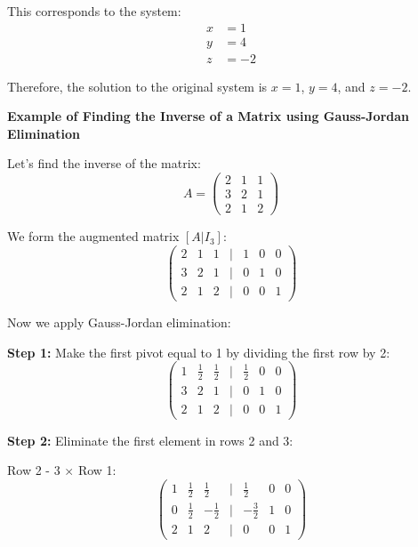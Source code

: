 This corresponds to the system:
\begin{align*}
x &= 1 \\
y &= 4 \\
z &= -2
\end{align*}

Therefore, the solution to the original system is \(x = 1\), \(y = 4\), and \(z = -2\).
\vspace{\baselineskip}

\textbf{Example of Finding the Inverse of a Matrix using Gauss-Jordan Elimination}
\vspace{\baselineskip}

Let's find the inverse of the matrix:
\begin{equation*}
A = 
\begin{pmatrix}
2 & 1 & 1 \\
3 & 2 & 1 \\
2 & 1 & 2
\end{pmatrix}
\end{equation*}

We form the augmented matrix \([A|I_3]\):
\begin{equation*}
\begin{pmatrix}
2 & 1 & 1 & | & 1 & 0 & 0 \\
3 & 2 & 1 & | & 0 & 1 & 0 \\
2 & 1 & 2 & | & 0 & 0 & 1
\end{pmatrix}
\end{equation*}

Now we apply Gauss-Jordan elimination:
\vspace{\baselineskip}

\textbf{Step 1:} Make the first pivot equal to 1 by dividing the first row by 2:
\begin{equation*}
\begin{pmatrix}
1 & \frac{1}{2} & \frac{1}{2} & | & \frac{1}{2} & 0 & 0 \\
3 & 2 & 1 & | & 0 & 1 & 0 \\
2 & 1 & 2 & | & 0 & 0 & 1
\end{pmatrix}
\end{equation*}

\textbf{Step 2:} Eliminate the first element in rows 2 and 3:

Row 2 - 3 \(\times\) Row 1:
\begin{equation*}
\begin{pmatrix}
1 & \frac{1}{2} & \frac{1}{2} & | & \frac{1}{2} & 0 & 0 \\
0 & \frac{1}{2} & -\frac{1}{2} & | & -\frac{3}{2} & 1 & 0 \\
2 & 1 & 2 & | & 0 & 0 & 1
\end{pmatrix}
\end{equation*}

